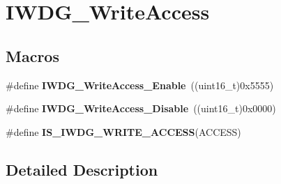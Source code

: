 \hypertarget{group___i_w_d_g___write_access}{\section{I\-W\-D\-G\-\_\-\-Write\-Access}
\label{group___i_w_d_g___write_access}
}
\subsection*{Macros}
\begin{DoxyCompactItemize}
\item 
\hypertarget{group___i_w_d_g___write_access_ga86f4b926f4351e19ea069f98c2e65f91}{\#define {\bfseries I\-W\-D\-G\-\_\-\-Write\-Access\-\_\-\-Enable}~((uint16\-\_\-t)0x5555)}\label{group___i_w_d_g___write_access_ga86f4b926f4351e19ea069f98c2e65f91}

\item 
\hypertarget{group___i_w_d_g___write_access_ga4b395cf5b2d7ab18fc71a5f779f758cc}{\#define {\bfseries I\-W\-D\-G\-\_\-\-Write\-Access\-\_\-\-Disable}~((uint16\-\_\-t)0x0000)}\label{group___i_w_d_g___write_access_ga4b395cf5b2d7ab18fc71a5f779f758cc}

\item 
\#define {\bfseries I\-S\-\_\-\-I\-W\-D\-G\-\_\-\-W\-R\-I\-T\-E\-\_\-\-A\-C\-C\-E\-S\-S}(A\-C\-C\-E\-S\-S)
\end{DoxyCompactItemize}


\subsection{Detailed Description}


